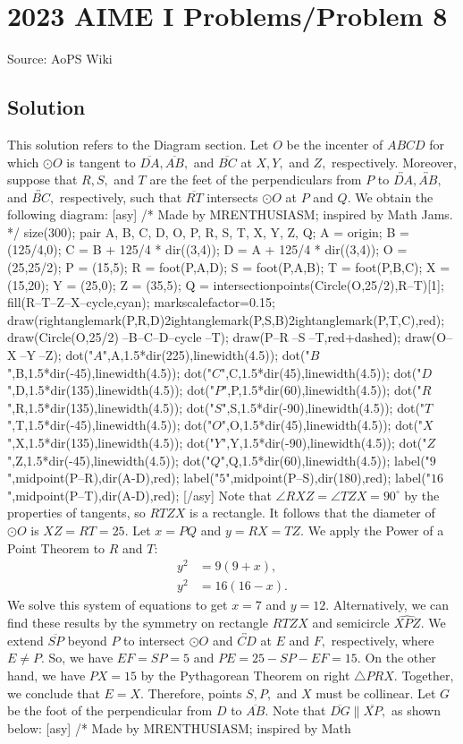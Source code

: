 \documentclass[12pt]{article}
\begin{document}
\section*{{2023 AIME I Problems/Problem 8}}
Source: AoPS Wiki

\subsection*{Solution}
This solution refers to the Diagram section. Let $O$ be the incenter of $ABCD$ for which $\odot O$ is tangent to $\overline{DA},\overline{AB},$ and $\overline{BC}$ at $X,Y,$ and $Z,$ respectively. Moreover, suppose that $R,S,$ and $T$ are the feet of the perpendiculars from $P$ to $\overleftrightarrow{DA},\overleftrightarrow{AB},$ and $\overleftrightarrow{BC},$ respectively, such that $\overline{RT}$ intersects $\odot O$ at $P$ and $Q.$ We obtain the following diagram: [asy] /* Made by MRENTHUSIASM; inspired by Math Jams. */ size(300); pair A, B, C, D, O, P, R, S, T, X, Y, Z, Q; A = origin; B = (125/4,0); C = B + 125/4 * dir((3,4)); D = A + 125/4 * dir((3,4)); O = (25,25/2); P = (15,5); R = foot(P,A,D); S = foot(P,A,B); T = foot(P,B,C); X = (15,20); Y = (25,0); Z = (35,5); Q = intersectionpoints(Circle(O,25/2),R--T)[1]; fill(R--T--Z--X--cycle,cyan); markscalefactor=0.15; draw(rightanglemark(P,R,D)^^rightanglemark(P,S,B)^^rightanglemark(P,T,C),red); draw(Circle(O,25/2)^^A--B--C--D--cycle^^B--T); draw(P--R^^P--S^^P--T,red+dashed); draw(O--X^^O--Y^^O--Z); dot("$A$",A,1.5*dir(225),linewidth(4.5)); dot("$B$",B,1.5*dir(-45),linewidth(4.5)); dot("$C$",C,1.5*dir(45),linewidth(4.5)); dot("$D$",D,1.5*dir(135),linewidth(4.5)); dot("$P$",P,1.5*dir(60),linewidth(4.5)); dot("$R$",R,1.5*dir(135),linewidth(4.5)); dot("$S$",S,1.5*dir(-90),linewidth(4.5)); dot("$T$",T,1.5*dir(-45),linewidth(4.5)); dot("$O$",O,1.5*dir(45),linewidth(4.5)); dot("$X$",X,1.5*dir(135),linewidth(4.5)); dot("$Y$",Y,1.5*dir(-90),linewidth(4.5)); dot("$Z$",Z,1.5*dir(-45),linewidth(4.5)); dot("$Q$",Q,1.5*dir(60),linewidth(4.5)); label("$9$",midpoint(P--R),dir(A-D),red); label("$5$",midpoint(P--S),dir(180),red); label("$16$",midpoint(P--T),dir(A-D),red); [/asy] Note that $\angle RXZ = \angle TZX = 90^\circ$ by the properties of tangents, so $RTZX$ is a rectangle. It follows that the diameter of $\odot O$ is $XZ = RT = 25.$ Let $x=PQ$ and $y=RX=TZ.$ We apply the Power of a Point Theorem to $R$ and $T:$ \begin{align*} y^2 &= 9(9+x), \\ y^2 &= 16(16-x). \end{align*} We solve this system of equations to get $x=7$ and $y=12.$ Alternatively, we can find these results by the symmetry on rectangle $RTZX$ and semicircle $\widehat{XPZ}.$ We extend $\overline{SP}$ beyond $P$ to intersect $\odot O$ and $\overleftrightarrow{CD}$ at $E$ and $F,$ respectively, where $E\neq P.$ So, we have $EF=SP=5$ and $PE=25-SP-EF=15.$ On the other hand, we have $PX=15$ by the Pythagorean Theorem on right $\triangle PRX.$ Together, we conclude that $E=X.$ Therefore, points $S,P,$ and $X$ must be collinear. Let $G$ be the foot of the perpendicular from $D$ to $\overline{AB}.$ Note that $\overline{DG}\parallel\overline{XP},$ as shown below: [asy] /* Made by MRENTHUSIASM; inspired by Math 
\end{document}
